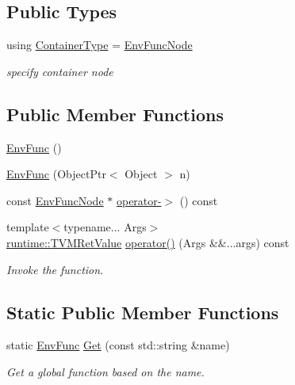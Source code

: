\subsection*{Public Types}
\begin{DoxyCompactItemize}
\item 
using \hyperlink{classtvm_1_1EnvFunc_aa40f838af3c55fe6ca8ecf2a256c8550}{Container\+Type} = \hyperlink{classtvm_1_1EnvFuncNode}{Env\+Func\+Node}
\begin{DoxyCompactList}\small\item\em specify container node \end{DoxyCompactList}\end{DoxyCompactItemize}
\subsection*{Public Member Functions}
\begin{DoxyCompactItemize}
\item 
\hyperlink{classtvm_1_1EnvFunc_aae6100a3a2f84f79fa8314c24fd516bc}{Env\+Func} ()
\item 
\hyperlink{classtvm_1_1EnvFunc_a1c210b670d3f990b6b8383a4abb7e6d6}{Env\+Func} (Object\+Ptr$<$ Object $>$ n)
\item 
const \hyperlink{classtvm_1_1EnvFuncNode}{Env\+Func\+Node} $\ast$ \hyperlink{classtvm_1_1EnvFunc_a4a8bfbfc8a923d8febc531173b3d213f}{operator-\/$>$} () const 
\item 
{\footnotesize template$<$typename... Args$>$ }\\\hyperlink{classtvm_1_1runtime_1_1TVMRetValue}{runtime\+::\+T\+V\+M\+Ret\+Value} \hyperlink{classtvm_1_1EnvFunc_a80e24e1342c276b1dfecf073b5be45f1}{operator()} (Args \&\&...args) const 
\begin{DoxyCompactList}\small\item\em Invoke the function. \end{DoxyCompactList}\end{DoxyCompactItemize}
\subsection*{Static Public Member Functions}
\begin{DoxyCompactItemize}
\item 
static \hyperlink{classtvm_1_1EnvFunc}{Env\+Func} \hyperlink{classtvm_1_1EnvFunc_a44b694c40d5ff79319ba02afa89fe5ab}{Get} (const std\+::string \&name)
\begin{DoxyCompactList}\small\item\em Get a global function based on the name. \end{DoxyCompactList}\end{DoxyCompactItemize}


